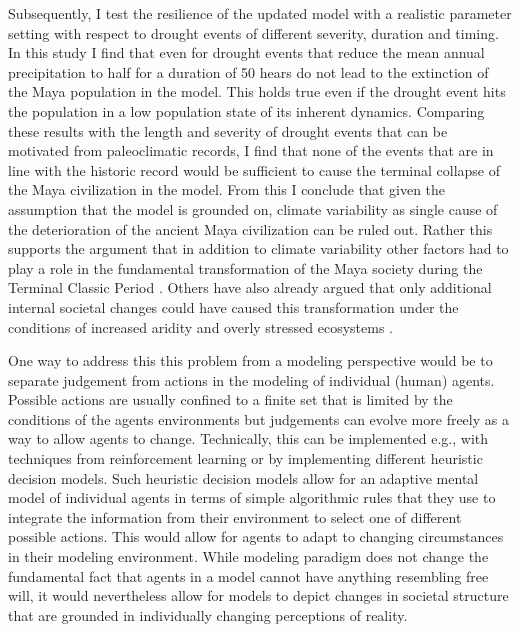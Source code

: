 Subsequently, I test the resilience of the updated model with a realistic parameter setting with respect to drought events of different severity, duration and timing. In this study I find that even for drought events that reduce the mean annual precipitation to half for a duration of 50 hears do not lead to the extinction of the Maya population in the model. This holds true even if the drought event hits the population in a low population state of its inherent dynamics. Comparing these results with the length and severity of drought events that can be motivated from paleoclimatic records, I find that none of the events that are in line with the historic record would be sufficient to cause the terminal collapse of the Maya civilization in the model.
From this I conclude that given the assumption that the model is grounded on, climate variability as single cause of the deterioration of the ancient Maya civilization can be ruled out. Rather this supports the argument that in addition to climate variability other factors had to play a role in the fundamental transformation of the Maya society during the Terminal Classic Period \citep{Masson2012}. Others have also already argued that only additional internal societal changes could have caused this transformation under the conditions of increased aridity and overly stressed ecosystems \citep{Turner2012a}.

One way to address this this problem from a modeling perspective would be to separate judgement from actions in the modeling of individual (human) agents. Possible actions are usually confined to a finite set that is limited by the conditions of the agents environments but judgements can evolve more freely as a way to  allow agents to change. Technically, this can be implemented e.g., with techniques from reinforcement learning \citep{Bu2008} or by implementing different heuristic decision models. Such heuristic decision models allow for an adaptive mental model of individual agents in terms of simple algorithmic rules that they use to integrate the information from their environment to select one of different possible actions.
This would allow for agents to adapt to changing circumstances in their modeling environment. While modeling paradigm does not change the fundamental fact that agents in a model cannot have anything resembling free will, it would nevertheless allow for models to depict changes in societal structure that are grounded in individually changing perceptions of reality.

